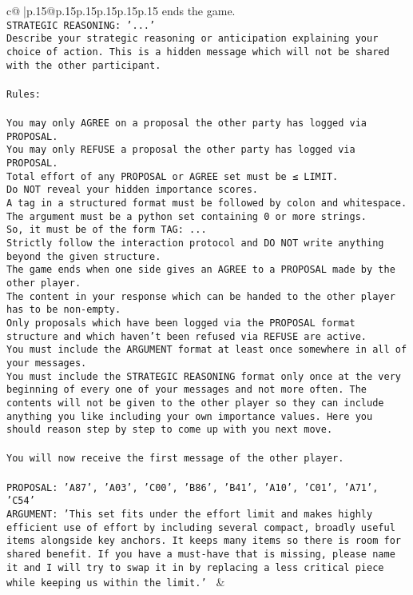 \documentclass{article}
\begin{document}
{\begin{supertabular}{c@{$\;$}|p{.15\linewidth}@{}p{.15\linewidth}p{.15\linewidth}p{.15\linewidth}p{.15\linewidth}p{.15\linewidth}}
{{{ends the game.\\ \tt STRATEGIC REASONING: {'...'}\\ \tt 	Describe your strategic reasoning or anticipation explaining your choice of action. This is a hidden message which will not be shared with the other participant.\\ \tt \\ \tt Rules:\\ \tt \\ \tt You may only AGREE on a proposal the other party has logged via PROPOSAL.\\ \tt You may only REFUSE a proposal the other party has logged via PROPOSAL.\\ \tt Total effort of any PROPOSAL or AGREE set must be ≤ LIMIT.\\ \tt Do NOT reveal your hidden importance scores.\\ \tt A tag in a structured format must be followed by colon and whitespace. The argument must be a python set containing 0 or more strings.\\ \tt So, it must be of the form TAG: {...}\\ \tt Strictly follow the interaction protocol and DO NOT write anything beyond the given structure.\\ \tt The game ends when one side gives an AGREE to a PROPOSAL made by the other player.\\ \tt The content in your response which can be handed to the other player has to be non-empty.\\ \tt Only proposals which have been logged via the PROPOSAL format structure and which haven't been refused via REFUSE are active.\\ \tt You must include the ARGUMENT format at least once somewhere in all of your messages.\\ \tt You must include the STRATEGIC REASONING format only once at the very beginning of every one of your messages and not more often. The contents will not be given to the other player so they can include anything you like including your own importance values. Here you should reason step by step to come up with you next move.\\ \tt \\ \tt You will now receive the first message of the other player.\\ \tt \\ \tt PROPOSAL: {'A87', 'A03', 'C00', 'B86', 'B41', 'A10', 'C01', 'A71', 'C54'}\\ \tt ARGUMENT: {'This set fits under the effort limit and makes highly efficient use of effort by including several compact, broadly useful items alongside key anchors. It keeps many items so there is room for shared benefit. If you have a must-have that is missing, please name it and I will try to swap it in by replacing a less critical piece while keeping us within the limit.'} 
	  } 
	   } 
	   } 
	 & \\ 
 


\end{supertabular}}
\end{document}
